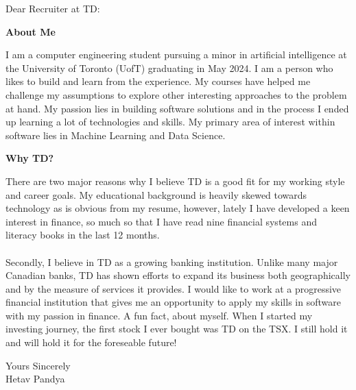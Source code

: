 \documentclass[a4paper,english]{friggeri-letter}
\begin{document}

\address{
   85 Wood St \\
   Toronto, ON, Canada
}





\opening{Dear Recruiter at TD:}

\textbf{About Me}

I am a computer engineering student pursuing a minor in artificial intelligence at the University of Toronto (UofT) graduating in May 2024. I am a person who likes to build and learn from the experience. My courses have helped me challenge my assumptions to explore other interesting approaches to the problem at hand. My passion lies in building software solutions and in the process I ended up learning a lot of technologies and skills. My primary area of interest within software lies in Machine Learning and Data Science.



\textbf{Why TD?}

There are two major reasons why I believe TD is a good fit for my working style and career goals. My educational background is heavily skewed towards technology as is obvious from my resume, however, lately I have developed a keen interest in finance, so much so that I have read nine financial systems and literacy books in the last 12 months. \\
\\Secondly, I believe in TD as a growing banking institution. Unlike many major Canadian banks, TD has shown efforts to expand its business both geographically and by the measure of services it provides.
I would like to work at a progressive financial institution that gives me an opportunity to apply my skills in software with my passion in finance. A fun fact, about myself. When I started my investing journey, the first stock I ever bought was TD on the TSX.
I still hold it and will hold it for the foreseable future!


\vspace*{0.1cm}
\closing{
   Yours Sincerely\\
   Hetav Pandya}
\end{document}
